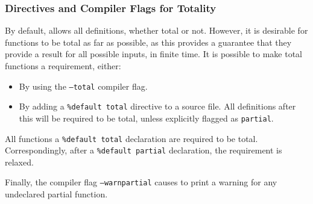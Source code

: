 \subsubsection{Directives and Compiler Flags for Totality}

By default, \Idris{} allows all definitions, whether total or not. However,
it is desirable for functions to be total as far as possible, as this
provides a guarantee that they provide a result for all possible inputs,
in finite time. It is possible to make total functions a requirement,
either:

\begin{itemize}
\item By using the \texttt{--total} compiler flag.
\item By adding a \texttt{\%default total} directive to a source file.
All definitions after this will be required to be total, unless
explicitly flagged as \texttt{partial}.
\end{itemize}

\noindent
All functions  a \texttt{\%default total} declaration are required
to be total. Correspondingly, after a \texttt{\%default partial} declaration,
the requirement is relaxed.

Finally, the compiler flag \texttt{--warnpartial} causes \Idris{} to print
a warning for any undeclared partial function.

